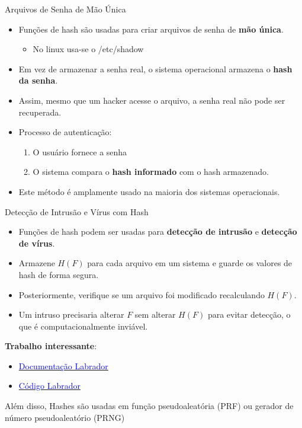 \begin{frame}{Arquivos de Senha de Mão Única}
    \begin{itemize}
        \item Funções de hash são usadas para criar arquivos de senha de \textbf{mão única}.
              \begin{itemize}
                  \item No linux usa-se o /etc/shadow
              \end{itemize}
        \item Em vez de armazenar a senha real, o sistema operacional armazena o \textbf{hash da senha}.
        \item Assim, mesmo que um hacker acesse o arquivo, a senha real não pode ser recuperada.
        \item Processo de autenticação:
              \begin{enumerate}
                  \item O usuário fornece a senha
                  \item O sistema compara o \textbf{hash informado} com o hash armazenado.
              \end{enumerate}
        \item Este método é amplamente usado na maioria dos sistemas operacionais.
    \end{itemize}
\end{frame}

\begin{frame}{Detecção de Intrusão e Vírus com Hash}
    \begin{itemize}
        \item Funções de hash podem ser usadas para \textbf{detecção de intrusão} e \textbf{detecção de vírus}.
        \item Armazene $H(F)$ para cada arquivo em um sistema e guarde os valores de hash de forma segura.
        \item Posteriormente, verifique se um arquivo foi modificado recalculando $H(F)$.
        \item Um intruso precisaria alterar $F$ sem alterar $H(F)$ para evitar detecção, o que é computacionalmente inviável.



    \end{itemize}

    \textbf{Trabalho interessante}:

    \begin{itemize}
        \item    \href{https://labrador-ids.sourceforge.net/about.html}{\textcolor{blue}{Documentação Labrador}}
        \item \href{https://sourceforge.net/projects/labrador-ids/}{\textcolor{blue}{Código Labrador}}
    \end{itemize}

    Além disso, Hashes são usadas em função pseudoaleatória (PRF) ou gerador de número pseudoaleatório (PRNG)

\end{frame}


